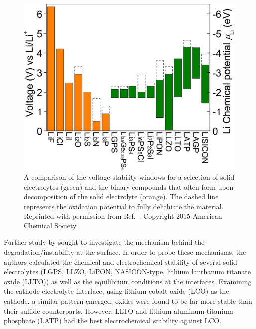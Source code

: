 \documentclass[../main.tex]{subfiles}
\begin{document}
\begin{figure}[H]
    \centering
    \includegraphics[scale=0.35]{figures/zhu2015_electrochemical_windows.png}
    \caption{A comparison of the voltage stability windows for a selection of solid electrolytes (green) and the binary compounds that often form upon decomposition of the solid electrolyte (orange). The dashed line represents the oxidation potential to fully delithiate the material. Reprinted with permission from Ref.~. Copyright 2015 American Chemical Society.}
    \label{fig:se_stab}
\end{figure}

Further study by \citeauthor{Zhu2016} sought to investigate the mechanism behind the degradation/instability at the surface.\cite{Zhu2016} In order to probe these mechanisms, the authors calculated the chemical and electrochemical stability of several solid electrolytes (LGPS, LLZO, LiPON, NASICON-type, lithium lanthanum titanate oxide (LLTO)) as well as the equilibrium conditions at the interfaces. Examining the cathode-electrolyte interface, using lithium cobalt oxide (LCO) as the cathode, a similar pattern emerged: oxides were found to be far more stable than their sulfide counterparts. However, LLTO and lithium aluminum titanium phosphate (LATP) had the best electrochemical stability against LCO.
\end{document}

